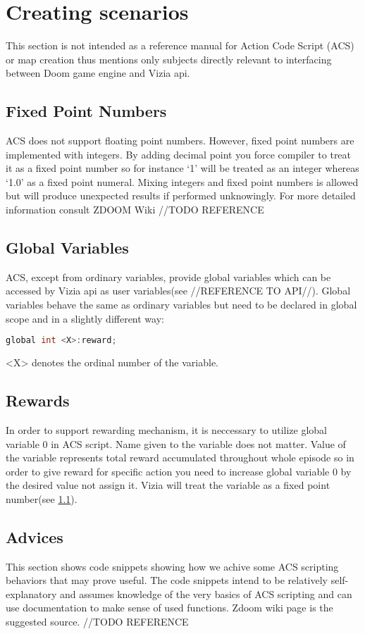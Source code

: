 \section{Creating scenarios}\label{sec:creating_scenarios}
	This section is not intended as a reference manual for Action Code Script (ACS) or map creation thus mentions only subjects directly relevant to interfacing between Doom game engine and Vizia api.


	\subsection{Fixed Point Numbers}\label{subsec:fixed_point}
		ACS does not support floating point numbers. However, fixed point numbers are implemented with integers. By adding decimal point you force compiler to treat it as a fixed point number so for instance `1' will be treated as an integer whereas `1.0' as a fixed point numeral. Mixing integers and fixed point numbers is allowed but will produce unexpected results if performed unknowingly. For more detailed information consult ZDOOM Wiki //TODO REFERENCE

	\subsection{Global Variables}\label{subsec:global_variable}
		ACS, except from ordinary variables, provide global variables which can be accessed by Vizia api as user variables(see //REFERENCE TO API//). Global variables behave the same as ordinary variables but need to be declared in global scope and in a slightly different way:
		\begin{lstlisting}[language=C++]
global int <X>:reward;
		\end{lstlisting}
		<X> denotes the ordinal number of the variable.
		
	\subsection{Rewards}
		In order to support rewarding mechanism, it is neccessary to utilize global variable 0 in ACS script. Name given to the variable does not matter. Value of the variable represents total reward accumulated throughout whole episode so in order to give reward for specific action you need to increase global variable 0 by the desired value not assign it. Vizia will treat the variable as a fixed point number(see \ref{subsec:fixed_point}).

	\subsection{Advices}
		This section shows code snippets showing how we achive some ACS scripting behaviors that may prove useful. The code snippets intend to be relatively self-explanatory and assumes knowledge of the very basics of ACS scripting and can use documentation to make sense of used functions. Zdoom wiki page is the suggested source. //TODO REFERENCE

